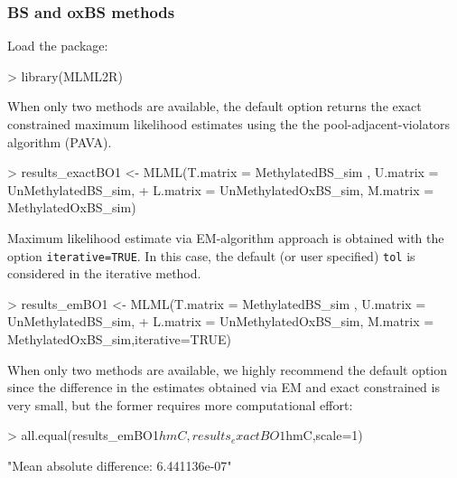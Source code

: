 \documentclass{article}
\begin{document}
\subsubsection{BS and oxBS methods}

 Load the package:

\begin{Schunk}
\begin{Sinput}
>  library(MLML2R)
\end{Sinput}
\end{Schunk}

 When only two methods are available, the default option returns the exact constrained maximum likelihood estimates  using the the pool-adjacent-violators algorithm (PAVA)\cite{ayer1955}.


\begin{Schunk}
\begin{Sinput}
>  results_exactBO1 <- MLML(T.matrix = MethylatedBS_sim , U.matrix = UnMethylatedBS_sim,
+  L.matrix = UnMethylatedOxBS_sim, M.matrix = MethylatedOxBS_sim)
\end{Sinput}
\end{Schunk}

Maximum likelihood estimate via EM-algorithm approach \cite{Qu:MLML} is obtained with the option \verb|iterative=TRUE|. In this case, the default (or user specified) \verb|tol| is considered in the iterative method.

\begin{Schunk}
\begin{Sinput}
>  results_emBO1 <- MLML(T.matrix = MethylatedBS_sim , U.matrix = UnMethylatedBS_sim,
+  L.matrix = UnMethylatedOxBS_sim, M.matrix = MethylatedOxBS_sim,iterative=TRUE)
\end{Sinput}
\end{Schunk}

 When only two methods are available, we highly recommend the default option  since the difference in the estimates obtained via EM and exact constrained is very small, but the former requires more computational effort:

\begin{Schunk}
\begin{Sinput}
>  all.equal(results_emBO1$hmC,results_exactBO1$hmC,scale=1)
\end{Sinput}
\begin{Soutput}
[1] "Mean absolute difference: 6.441136e-07"
\end{Soutput}
\end{Schunk}
\end{document}
